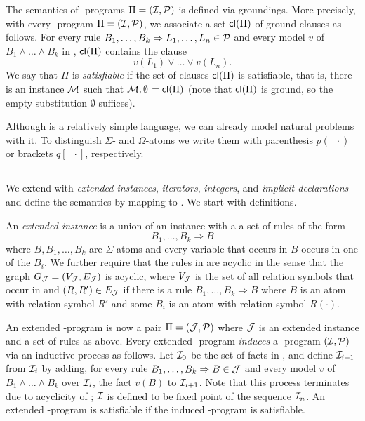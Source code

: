 \documentclass[conference]{IEEEtran}
\begin{document}
The semantics of \bcore-programs $\Pi=(\mathcal{I},\mathcal{P})$ is defined via groundings. 
More precisely, with every \bcore-program $\Pi=(\mathcal{I},\mathcal{P})$, we associate a set $\mathsf{cl}(\Pi)$ of ground clauses as follows.  
For every rule $B_1,\ldots,B_k \Rightarrow L_1,\ldots, L_n\in\mathcal{P}$ and every model $v$ of $B_1\wedge\ldots\wedge B_k$ in \Imc, $\mathsf{cl}(\Pi)$ contains the clause
%
\[v(L_1)\vee\ldots\vee v(L_n).\]
%
We say that $\Pi$ is \emph{satisfiable} if the set of clauses $\mathsf{cl}(\Pi)$ is satisfiable, that is, 
there is an instance $\mathcal{M}$ such that $\mathcal{M},\emptyset \models\mathsf{cl}(\Pi)$ (note that $\mathsf{cl}(\Pi)$ is ground, so the empty substitution $\emptyset$ suffices).

{\color{red} Although \bcore is a relatively simple language, we can
already model natural problems with it. To distinguish $\Sigma$- and
$\Omega$-atoms we write them with parenthesis $p(\;\;\cdot)$ or brackets
$q[\;\;\cdot]$,
respectively.


\begin{example}
  
\end{example}

}


\subsection{\bfull}

We extend \bcore with \emph{extended instances}, \emph{iterators},
\emph{integers}, and \emph{implicit declarations} and define the
semantics by mapping to \bcore. We start with definitions. 

An \emph{extended instance \Jmc} is a union of an instance \Imc with a
a set of rules of the form
%
\[B_1,\ldots,B_k\Rightarrow B\]
%
where $B,B_1,\ldots,B_k$ are $\Sigma$-atoms and every variable that
occurs in $B$ occurs in one of the $B_i$. We further require that the
rules in \Jmc are acyclic in the sense that the graph $G_\mathcal{J} = (V_\mathcal{J},E_\mathcal{J})$ is
acyclic, where $V_\mathcal{J}$ is the set of all relation symbols that occur in
\Jmc and $(R,R')\in E_\mathcal{J}$ if there is a rule
$B_1,\ldots,B_k\Rightarrow B$ where $B$ is an atom with relation
symbol $R'$ and some $B_i$ is an atom with relation symbol $R(\cdot)$.  

An extended \bcore-program is now a pair $\Pi=(\mathcal{J},\mathcal{P})$ where
$\mathcal{J}$ is an extended instance and \Pmc a set of rules as above. Every
extended \bcore-program \emph{induces} a \bcore-program $(\mathcal{I},\mathcal{P})$
via an inductive process as follows. Let $\mathcal{I}_0$ be the set of facts
in \Jmc, and define $\mathcal{I}_{i+1}$ from $\mathcal{I}_i$ by adding, for every
rule $B_1,\ldots,B_k\Rightarrow B\in \mathcal{J}$ and every model $v$ of
$B_1\wedge \ldots \wedge B_k$ over $\mathcal{I}_i$, the fact $v(B)$ to
$\mathcal{I}_{i+1}$. Note that this process terminates due to acyclicity of
\Jmc; $\mathcal{I}$ is defined to be fixed point of the sequence $\mathcal{I}_n$. An
extended \bcore-program is satisfiable if the induced \bcore-program
is satisfiable. 
\end{document}
